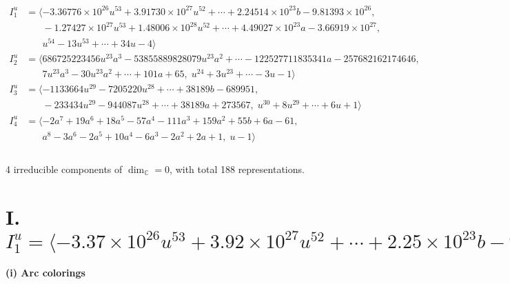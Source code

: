 \documentclass[1p]{elsarticle_modified}
\theoremstyle{definition}
\begin{document}
\begin{align*}
I^u_{1}&=\langle 
-3.36776\times10^{26} u^{53}+3.91730\times10^{27} u^{52}+\cdots+2.24514\times10^{23} b-9.81393\times10^{26},\\
\phantom{I^u_{1}}&\phantom{= \langle  }-1.27427\times10^{27} u^{53}+1.48006\times10^{28} u^{52}+\cdots+4.49027\times10^{23} a-3.66919\times10^{27},\\
\phantom{I^u_{1}}&\phantom{= \langle  }u^{54}-13 u^{53}+\cdots+34 u-4\rangle \\
I^u_{2}&=\langle 
686725223456 u^{23} a^3-53855889828079 u^{23} a^2+\cdots-122527711835341 a-257682162174646,\\
\phantom{I^u_{2}}&\phantom{= \langle  }7 u^{23} a^3-30 u^{23} a^2+\cdots+101 a+65,\;u^{24}+3 u^{23}+\cdots-3 u-1\rangle \\
I^u_{3}&=\langle 
-1133664 u^{29}-7205220 u^{28}+\cdots+38189 b-689951,\\
\phantom{I^u_{3}}&\phantom{= \langle  }-233434 u^{29}-944087 u^{28}+\cdots+38189 a+273567,\;u^{30}+8 u^{29}+\cdots+6 u+1\rangle \\
I^u_{4}&=\langle 
-2 a^7+19 a^6+18 a^5-57 a^4-111 a^3+159 a^2+55 b+6 a-61,\\
\phantom{I^u_{4}}&\phantom{= \langle  }a^8-3 a^6-2 a^5+10 a^4-6 a^3-2 a^2+2 a+1,\;u-1\rangle \\
\\
\end{align*}
\raggedright * 4 irreducible components of $\dim_{\mathbb{C}}=0$, with total 188 representations.\\
\newpage
\renewcommand{\arraystretch}{1}
\centering \section*{I. $I^u_{1}= \langle -3.37\times10^{26} u^{53}+3.92\times10^{27} u^{52}+\cdots+2.25\times10^{23} b-9.81\times10^{26},\;-1.27\times10^{27} u^{53}+1.48\times10^{28} u^{52}+\cdots+4.49\times10^{23} a-3.67\times10^{27},\;u^{54}-13 u^{53}+\cdots+34 u-4 \rangle$}
\flushleft \textbf{(i) Arc colorings}\\
\end{document}
